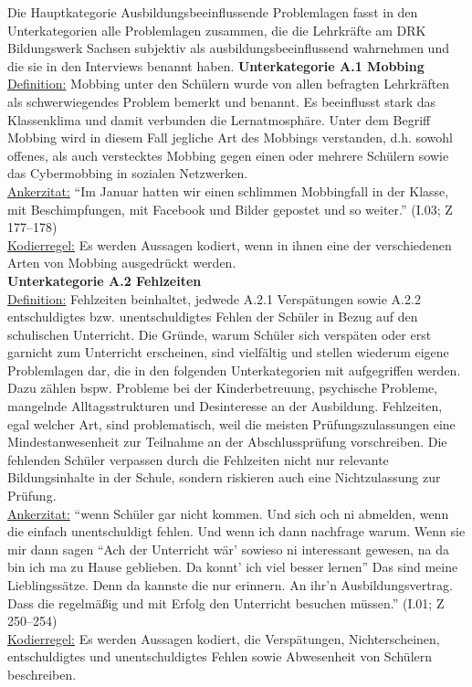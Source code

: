 Die Hauptkategorie Ausbildungsbeeinflussende Problemlagen fasst in den Unterkategorien alle Problemlagen zusammen, die die Lehrkräfte am DRK Bildungswerk Sachsen subjektiv als ausbildungsbeeinflussend wahrnehmen und die sie in den Interviews benannt haben.
\textbf{Unterkategorie A.1 Mobbing}\\
\underline{Definition:} Mobbing unter den Schülern wurde von allen befragten Lehrkräften als schwerwiegendes Problem bemerkt und benannt. Es beeinflusst stark das Klassenklima und damit verbunden die Lernatmosphäre. Unter dem Begriff Mobbing wird in diesem Fall jegliche Art des Mobbings verstanden, d.h. sowohl offenes, als auch verstecktes Mobbing gegen einen oder mehrere Schülern sowie das Cybermobbing in sozialen Netzwerken.\\
\underline{Ankerzitat:} "`Im Januar hatten wir einen schlimmen Mobbingfall in der Klasse, mit Beschimpfungen, mit Facebook und Bilder gepostet und so weiter."' (I.03; Z 177--178)\\
\underline{Kodierregel:} Es werden Aussagen kodiert, wenn in ihnen eine der verschiedenen Arten von Mobbing ausgedrückt werden.\\

\textbf{Unterkategorie A.2 Fehlzeiten}\\
\underline{Definition:} Fehlzeiten beinhaltet, jedwede A.2.1 Verspätungen sowie A.2.2 entschuldigtes bzw. unentschuldigtes Fehlen der Schüler in Bezug auf den schulischen Unterricht. Die Gründe, warum Schüler sich verspäten oder erst garnicht zum Unterricht erscheinen, sind vielfältig und stellen wiederum eigene Problemlagen dar, die in den folgenden Unterkategorien mit aufgegriffen werden. Dazu zählen bspw. Probleme bei der Kinderbetreuung, psychische Probleme, mangelnde Alltagsstrukturen und Desinteresse an der Ausbildung. Fehlzeiten, egal welcher Art, sind problematisch, weil die meisten Prüfungszulassungen eine Mindestanwesenheit zur Teilnahme an der Abschlussprüfung vorschreiben. Die fehlenden Schüler verpassen durch die Fehlzeiten nicht nur relevante Bildungsinhalte in der Schule, sondern riskieren auch eine Nichtzulassung zur Prüfung. \\
\underline{Ankerzitat:} "`wenn Schüler gar nicht kommen. Und sich och ni abmelden, wenn die einfach unentschuldigt fehlen. Und wenn ich dann nachfrage warum. Wenn sie mir dann sagen "`Ach der Unterricht wär' sowieso ni interessant gewesen, na da bin ich ma zu Hause geblieben. Da konnt' ich viel besser lernen"' Das sind meine Lieblingssätze. Denn da kannste die nur erinnern. An ihr'n Ausbildungsvertrag. Dass die regelmäßig und mit Erfolg den Unterricht besuchen müssen."' (I.01; Z 250--254)\\
\underline{Kodierregel:} Es werden Aussagen kodiert, die Verspätungen, Nichterscheinen, entschuldigtes und unentschuldigtes Fehlen sowie Abwesenheit von Schülern beschreiben. \\

